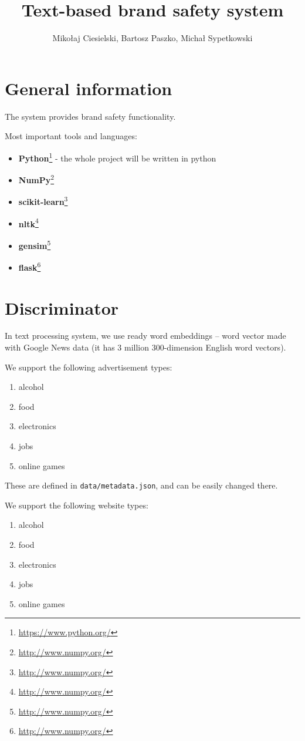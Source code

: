 \documentclass[a4paper]{article}
\begin{document}
\title{Text-based brand safety system}

\author{Mikołaj Ciesielski, Bartosz Paszko, Michał Sypetkowski}
\maketitle

\section{General information}

The system provides brand safety functionality.

Most important tools and languages:
\begin{itemize}
    \item \textbf{Python}\footnote{\url{https://www.python.org/}}
        - the whole project will be written in python
    \item \textbf{NumPy}\footnote{\url{http://www.numpy.org/}}
    \item \textbf{scikit-learn}\footnote{\url{http://www.numpy.org/}}
    \item \textbf{nltk}\footnote{\url{http://www.numpy.org/}}
    \item \textbf{gensim}\footnote{\url{http://www.numpy.org/}}
    \item \textbf{flask}\footnote{\url{http://www.numpy.org/}}
\end{itemize}


\section{Discriminator}
In text processing system, we use ready word embeddings --
word vector made with Google News data (it has 3 million 300-dimension English word vectors).


We support the following advertisement types:
\begin{enumerate}
    \item alcohol
    \item food
    \item electronics
    \item jobs
    \item online games
\end{enumerate}
These are defined in \texttt{data/metadata.json}, and can be easily changed there.

We support the following website types:
\begin{enumerate}
    \item alcohol
    \item food
    \item electronics
    \item jobs
    \item online games
\end{enumerate}
\end{document}
